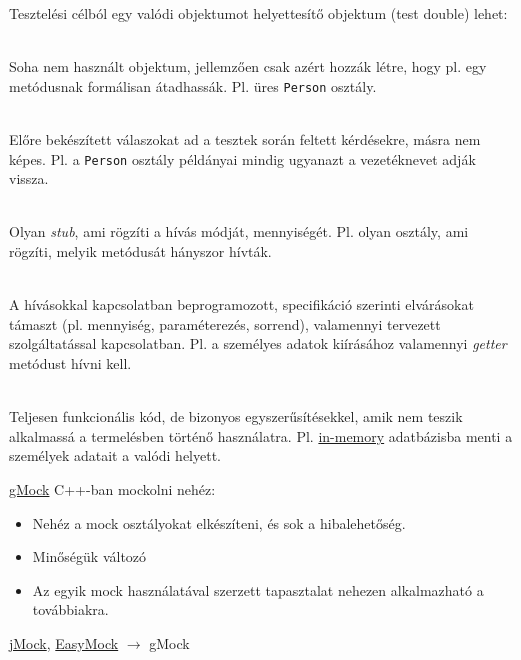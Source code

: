 \documentclass[usenames,dvipsnames,aspectratio=169]{beamer}
\newcommand{\hiv}[1]{{\color{hivatkozasszin}#1}}
\begin{document}
\begin{frame}
    Tesztelési célból egy valódi objektumot helyettesítő objektum (test double) lehet:
    \begin{description}[m]
        \footnotesize
        \item[Dummy] \hfill \\ Soha nem használt objektum, jellemzően csak azért hozzák létre, hogy pl. egy metódusnak formálisan átadhassák. Pl. üres \texttt{Person} osztály.
        \item [Stub] \hfill \\ Előre bekészített válaszokat ad a tesztek során feltett kérdésekre, másra nem képes. Pl. a \texttt{Person} osztály példányai mindig ugyanazt a vezetéknevet adják vissza.
        \item [Spy] \hfill \\ Olyan \emph{stub}, ami rögzíti a hívás módját, mennyiségét. Pl. olyan osztály, ami rögzíti, melyik metódusát hányszor hívták.
        \item [Mock] \hfill \\ A hívásokkal kapcsolatban beprogramozott, specifikáció szerinti elvárásokat támaszt (pl. mennyiség, paraméterezés, sorrend), valamennyi tervezett szolgáltatással kapcsolatban. Pl. a személyes adatok kiírásához valamennyi \emph{getter} metódust hívni kell.
        \item [Fake] \hfill \\ Teljesen funkcionális kód, de bizonyos egyszerűsítésekkel, amik nem teszik alkalmassá a termelésben történő használatra. Pl. \hiv{\href{https://en.wikipedia.org/wiki/List\_of\_in-memory\_databases}{in-memory}} adatbázisba menti a személyek adatait a valódi helyett.
    \end{description}
\end{frame}

\begin{frame}
    \hiv{\href{https://google.github.io/googletest/gmock_for_dummies.html}{gMock}}
    \vfill
    C++-ban mockolni nehéz:
    \begin{itemize}
        \item Nehéz a mock osztályokat elkészíteni, és sok a hibalehetőség.
        \item Minőségük változó
        \item Az egyik mock használatával szerzett tapasztalat nehezen alkalmazható a továbbiakra.
    \end{itemize}
    \vfill
    \hiv{\href{http://jmock.org/}{jMock}}, \hiv{\href{https://easymock.org/}{EasyMock}} $\to$ gMock
\end{frame}
\end{document}
